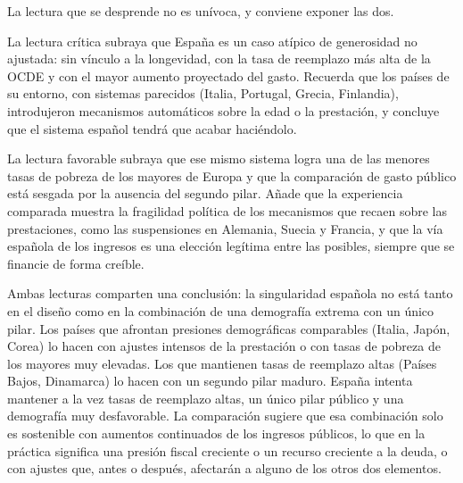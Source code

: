 \documentclass[10pt,a4paper]{article}
\begin{document}
La lectura que se desprende no es unívoca, y conviene exponer las dos.

La lectura crítica subraya que España es un caso atípico de generosidad no ajustada: sin vínculo a la longevidad, con la tasa de reemplazo más alta de la OCDE y con el mayor aumento proyectado del gasto. Recuerda que los países de su entorno, con sistemas parecidos (Italia, Portugal, Grecia, Finlandia), introdujeron mecanismos automáticos sobre la edad o la prestación, y concluye que el sistema español tendrá que acabar haciéndolo.

La lectura favorable subraya que ese mismo sistema logra una de las menores tasas de pobreza de los mayores de Europa y que la comparación de gasto público está sesgada por la ausencia del segundo pilar. Añade que la experiencia comparada muestra la fragilidad política de los mecanismos que recaen sobre las prestaciones, como las suspensiones en Alemania, Suecia y Francia, y que la vía española de los ingresos es una elección legítima entre las posibles, siempre que se financie de forma creíble.

Ambas lecturas comparten una conclusión: la singularidad española no está tanto en el diseño como en la combinación de una demografía extrema con un único pilar. Los países que afrontan presiones demográficas comparables (Italia, Japón, Corea) lo hacen con ajustes intensos de la prestación o con tasas de pobreza de los mayores muy elevadas. Los que mantienen tasas de reemplazo altas (Países Bajos, Dinamarca) lo hacen con un segundo pilar maduro. España intenta mantener a la vez tasas de reemplazo altas, un único pilar público y una demografía muy desfavorable. La comparación sugiere que esa combinación solo es sostenible con aumentos continuados de los ingresos públicos, lo que en la práctica significa una presión fiscal creciente o un recurso creciente a la deuda, o con ajustes que, antes o después, afectarán a alguno de los otros dos elementos.
\end{document}
